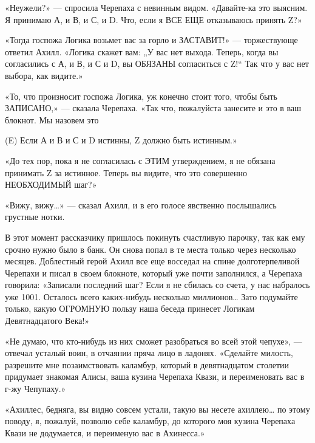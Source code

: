 «Неужели?» --- спросила Черепаха с невинным видом. «Давайте-ка это выясним. Я принимаю А, и В, и С, и D. Что, если я ВСЕ ЕЩЕ отказываюсь принять Z?»

«Тогда госпожа Логика возьмет вас за горло и ЗАСТАВИТ!» --- торжествующе ответил Ахилл. «Логика скажет вам: „У вас нет выхода. Теперь, когда вы согласились с А, и В, и С и D, вы ОБЯЗАНЫ согласиться с Z!{}`` Так что у вас нет выбора, как видите.»

«То, что произносит госпожа Логика, уж конечно стоит того, чтобы быть ЗАПИСАНО,» --- сказала Черепаха. «Так что, пожалуйста занесите и это в ваш блокнот. Мы назовем это

(E) Если А и В и С и D истинны, Z должно быть истинным.»

«До тех пор, пока я не согласилась с ЭТИМ утверждением, я не обязана принимать Z за истинное. Теперь вы видите, что это совершенно НЕОБХОДИМЫЙ шаг?»

«Вижу, вижу\ldots» --- сказал Ахилл, и в его голосе явственно послышались грустные нотки.

В этот момент рассказчику пришлось покинуть счастливую парочку, так как ему срочно нужно было в банк. Он снова попал в те места только через несколько месяцев. Доблестный герой Ахилл все еще восседал на спине долготерпеливой Черепахи и писал в своем блокноте, который уже почти заполнился, а Черепаха говорила: «Записали последний шаг? Если я не сбилась со счета, у нас набралось уже 1001. Осталось всего каких-нибудь несколько миллионов\ldots{} Зато подумайте только, какую ОГРОМНУЮ пользу наша беседа принесет Логикам Девятнадцатого Века!»

«Не думаю, что кто-нибудь из них сможет разобраться во всей этой чепухе», --- отвечал усталый воин, в отчаянии пряча лицо в ладонях. «Сделайте милость, разрешите мне позаимствовать каламбур, который в девятнадцатом столетии придумает знакомая Алисы, ваша кузина Черепаха Квази, и переименовать вас в г-жу Чепупаху.»

«Ахиллес, бедняга, вы видно совсем устали, такую вы несете ахиллею\ldots{} по этому поводу, я, пожалуй, позволю себе каламбур, до которого моя кузина Черепаха Квази не додумается, и переименую вас в Ахинесса.»

